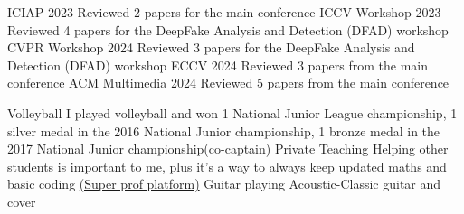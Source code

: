 


\begin{cvskills}
\cvskill
    {ICIAP 2023} %
    {Reviewed 2 papers for the main conference} %
\cvskill
    {ICCV Workshop 2023} %
    {Reviewed 4 papers for the DeepFake Analysis and Detection (DFAD) workshop } %
\cvskill
    {CVPR Workshop 2024} %
    {Reviewed 3 papers for the DeepFake Analysis and Detection (DFAD) workshop } %
\cvskill
    {ECCV 2024} %
    {Reviewed 3 papers from the main conference} %
\cvskill
    {ACM Multimedia 2024} %
    {Reviewed 5 papers from the main conference} %

\end{cvskills}



\begin{cvskills}
\cvskill
    {Volleyball} %
    {I played volleyball and won 1 National Junior League championship, 1 silver medal in the 2016 National Junior championship, 1 bronze medal in the 2017 National Junior championship(co-captain)} %
\cvskill
    {Private Teaching} %
    {Helping other students is important to me, plus it's a way to always keep updated maths and basic coding \href{https://www.superprof.it/laureato-triennale-ingegneria-informatica-perito-informatico-offro-approccio-sia-tecnico-che-pratico-alle-materie.html}{(Super prof platform)}} %
\cvskill
    {Guitar playing} %
    {Acoustic-Classic guitar and cover} %

\end{cvskills}
